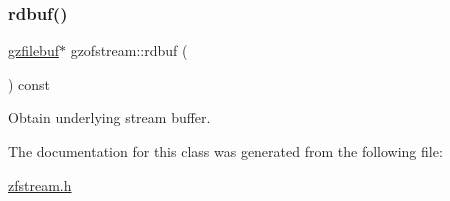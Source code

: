 \subsubsection{\texorpdfstring{rdbuf()}{rdbuf()}}
{\footnotesize\ttfamily \hyperlink{classgzfilebuf}{gzfilebuf}$\ast$ gzofstream\+::rdbuf (\begin{DoxyParamCaption}{ }\end{DoxyParamCaption}) const\hspace{0.3cm}{\ttfamily [inline]}}

Obtain underlying stream buffer. 

The documentation for this class was generated from the following file\+:\begin{DoxyCompactItemize}
\item 
\hyperlink{zfstream_8h}{zfstream.\+h}\end{DoxyCompactItemize}
